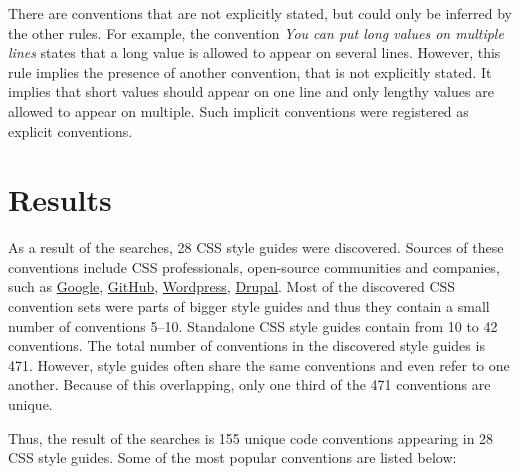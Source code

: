 There are conventions that are not explicitly stated, but could only be
inferred by the other rules. For example, the convention \textit{You can put
long values on multiple lines} states that a long value is allowed to appear
on several lines. However, this rule implies the presence of another
convention, that is not explicitly stated. It implies that short values should
appear on one line and only lengthy values are allowed to appear on multiple.
Such implicit conventions were registered as explicit conventions.

\section{Results}

As a result of the searches, 28 CSS style guides were discovered. Sources of
these conventions include CSS professionals, open-source communities and
companies, such as
\href{https://google-styleguide.googlecode.com/svn/trunk/htmlcssguide.xml#Protocol}{Google},
\href{http://primercss.io/guidelines/#css}{GitHub},
\href{https://make.wordpress.org/core/handbook/best-practices/coding-standards/css/}{Wordpress},
\href{https://www.drupal.org/node/1887862}{Drupal}. Most of the discovered CSS
convention sets were parts of bigger style guides and thus they contain a
small number of conventions 5--10. Standalone CSS style guides contain from 10
to 42 conventions. The total number of conventions in the discovered style
guides is 471. However, style guides often share the same conventions and even
refer to one another. Because of this overlapping, only one third of the 471
conventions are unique.

Thus, the result of the searches is 155 unique code conventions appearing in
28 CSS style guides. Some of the most popular conventions are listed below:

